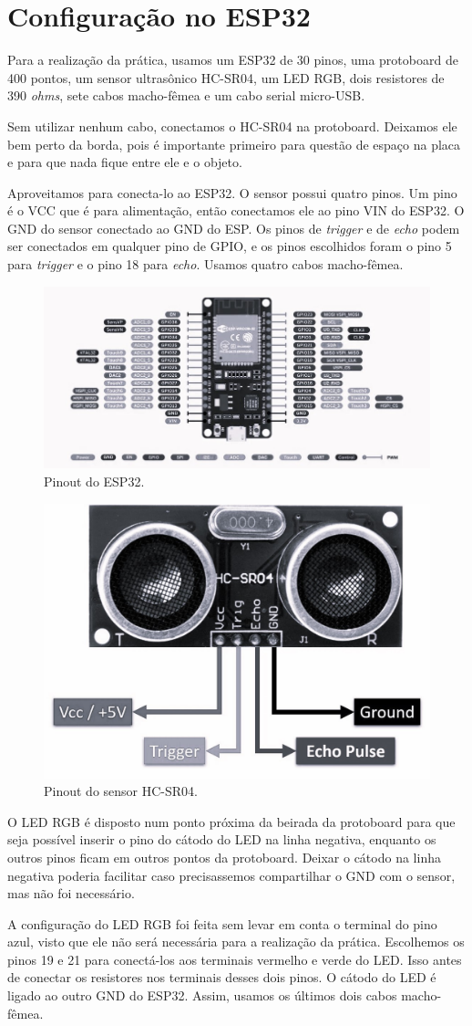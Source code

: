 \section{Configuração no ESP32}

Para a realização da prática, usamos um ESP32 de 30 pinos, uma protoboard de 400 pontos, um sensor ultrasônico HC-SR04, um LED RGB, dois resistores de 390 \textit{ohms}, sete cabos macho-fêmea e um cabo serial micro-USB.

Sem utilizar nenhum cabo, conectamos o HC-SR04 na protoboard. Deixamos ele bem perto da borda, pois é importante primeiro para questão de espaço na placa e para que nada fique entre ele e o objeto.


Aproveitamos para conecta-lo ao ESP32. O sensor possui quatro pinos. Um pino é o VCC que é para alimentação, então conectamos ele ao pino VIN do ESP32. O GND do sensor conectado ao GND do ESP. Os pinos de \textit{trigger} e de \textit{echo} podem ser conectados em qualquer pino de GPIO, e os pinos escolhidos foram o pino 5 para \textit{trigger} e o pino 18 para \textit{echo}. Usamos quatro cabos macho-fêmea.

\begin{figure}[H]
    \centering
    \includegraphics[width=0.5\linewidth]{img/esp32_pinout.png}
    \caption{Pinout do ESP32.}
    \label{fig:esp32-pinout}
\end{figure}

\begin{figure}[H]
    \centering
    \includegraphics[width=0.5\linewidth]{img/HC-SR04-Ultrasonic-Sensor-Pinout.jpg}
    \caption{Pinout do sensor HC-SR04.}
    \label{fig:HC-SR04-pinout}
\end{figure}

O LED RGB é disposto num ponto próxima da beirada da protoboard para que seja possível inserir o pino do cátodo do LED na linha negativa, enquanto os outros pinos ficam em outros pontos da protoboard. Deixar o cátodo na linha negativa poderia facilitar caso precisassemos compartilhar o GND com o sensor, mas não foi necessário.

A configuração do LED RGB foi feita sem levar em conta o terminal do pino azul, visto que ele não será necessária para a realização da prática. Escolhemos os pinos 19 e 21 para conectá-los aos terminais vermelho e verde do LED. Isso antes de conectar os resistores nos terminais desses dois pinos. O cátodo do LED é ligado ao outro GND do ESP32. Assim, usamos os últimos dois cabos macho-fêmea.